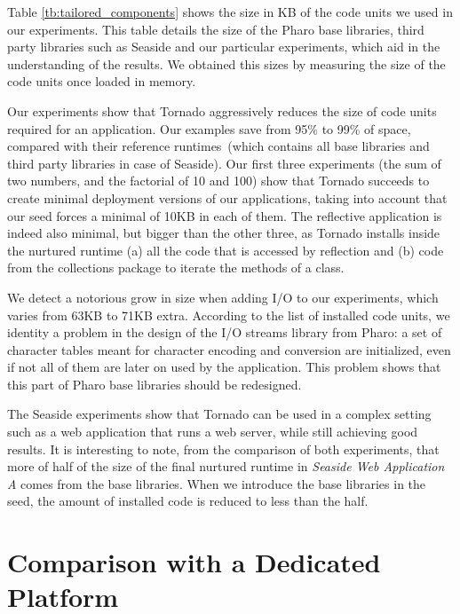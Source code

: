 Table \ref{tb:tailored_components} shows the size in KB of the code units we used in our experiments. This table details the size of the Pharo base libraries, third party libraries such as Seaside and our particular experiments, which aid in the understanding of the results. We obtained this sizes by measuring the size of the code units once loaded in memory.

Our experiments show that Tornado aggressively reduces the size of code units required for an application. Our examples save from 95\% to 99\% of space, compared with their reference runtimes~(which contains all base libraries and third party libraries in case of Seaside). Our first three experiments (the sum of two numbers, and the factorial of 10 and 100) show that Tornado succeeds to create minimal deployment versions of our applications, taking into account that our seed forces a minimal of 10KB in each of them. The reflective application is indeed also minimal, but bigger than the other three, as Tornado installs inside the nurtured runtime (a) all the code that is accessed by reflection and (b) code from the collections package to iterate the methods of a class.

We detect a notorious grow in size when adding I/O to our experiments, which varies from 63KB to 71KB extra. According to the list of installed code units, we identity a problem in the design of the I/O streams library from Pharo: a set of character tables meant for character encoding and conversion are initialized, even if not all of them are later on used by the application. This problem shows that this part of Pharo base libraries should be redesigned.

The Seaside experiments show that Tornado can be used in a complex setting such as a web application that runs a web server, while still achieving good results. It is interesting to note, from the comparison of both experiments, that more of half of the size of the final nurtured runtime in \emph{Seaside Web Application A} comes from the base libraries. When we introduce the base libraries in the seed, the amount of installed code is reduced to less than the half.

\section{Comparison with a Dedicated Platform}

